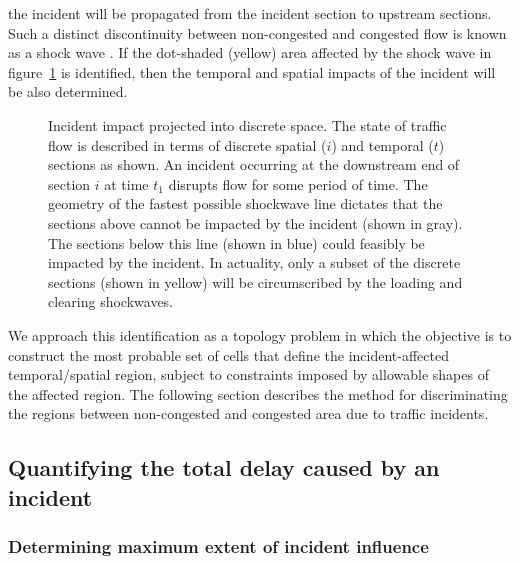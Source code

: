\documentclass[12pt]{report}
\newcommand{\inputTikZ}[1]{%
  }
\newcommand{\inputTikZ}[1]{%
    \beginpgfgraphicnamed{#1-external}%
    \endpgfgraphicnamed%
  }
\begin{document}
the incident will be propagated from the incident section to upstream
sections.  Such a distinct discontinuity between non-congested and
congested flow is known as a shock wave
\cite{lighthill55:_kinem_waves}.  If the dot-shaded (yellow) area
affected by the shock wave in figure~\ref{fig:incident-impact} is
identified, then the temporal and spatial impacts of the incident will
be also determined. 
\begin{figure}[tbp]
  \begin{center}
    \inputTikZ{figs/time-space-incident-schematic}
    \caption[Incident impact projected into discrete space]{Incident
      impact projected into discrete space.  The state of traffic flow
      is described in terms of discrete spatial ($i$) and temporal ($t$)
      sections as shown.  An incident occurring at the downstream end of
      section $i$ at time $t_1$ disrupts flow for some period of time.
      The geometry of the fastest possible shockwave line dictates that
      the sections above cannot be impacted by the incident (shown in
      gray).  The sections below this line (shown in blue) could
      feasibly be impacted by the incident.  In actuality, only a subset
      of the discrete sections (shown in yellow) will be circumscribed
      by the loading and clearing shockwaves.}
    \label{fig:incident-impact}
  \end{center}
\end{figure}
We approach this identification as a topology problem in which the
objective is to construct the most probable set of cells that define
the incident-affected temporal/spatial region, subject to constraints
imposed by allowable shapes of the affected region. The following
section describes the method for discriminating the regions between
non-congested and congested area due to traffic incidents.


\subsection{Quantifying the total delay caused by an incident}
\label{sec:delay-calc}

\subsubsection{Determining maximum extent of incident influence}
\label{sec:max-infl}
\end{document}
